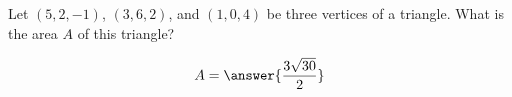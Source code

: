 \documentclass{ximera}
\author{Gregory Hartman \and Matthew Carr}
\begin{document}
\begin{exercise}



Let $(5,2,-1)$, $(3,6,2)$, and $(1,0,4)$ be three vertices of a triangle. What is the area $A$ of this triangle?
\begin{prompt}
\[
A=\answer{\frac{3\sqrt{30}}{2}}
\]
\end{prompt}


\end{exercise}
\end{document}
